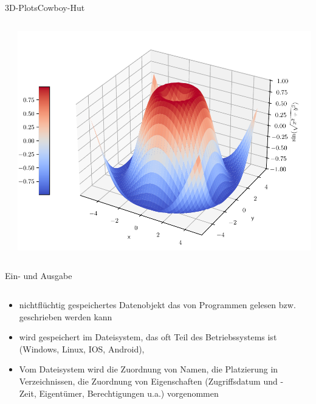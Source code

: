 \documentclass[xelatex,aspectratio=169]{beamer}
\begin{document}
\begin{frame}{3D-Plots}{Cowboy-Hut}
    \begin{columns}
        \begin{column}{0.6\textwidth}
            \vspace{-\baselineskip}
            \small
            \inputminted[firstline=7]{python}{src/plt_3d_cowboy.py}
        \end{column}
        \begin{column}{0.4\textwidth}
            \includegraphics[width=\textwidth]{fig/plt_3d_cowboy.pdf}
        \end{column}
    \end{columns}
\end{frame}

\begin{frame}{Ein- und Ausgabe}
    \begin{columns}
        \begin{column}{0.5\textwidth}
            \begin{itemize}
                \item nichtflüchtig gespeichertes Datenobjekt das von Programmen gelesen bzw. geschrieben werden kann
                \item wird gespeichert im Dateisystem, das oft Teil des Betriebssystems ist (Windows, Linux, IOS, Android),
                \item Vom Dateisystem wird die Zuordnung von Namen, die Platzierung in Verzeichnissen, die Zuordnung von Eigenschaften (Zugriffsdatum und -Zeit, Eigentümer, Berechtigungen u.a.) vorgenommen
            \end{itemize}
        \end{column}
        \begin{column}{0.5\textwidth}
        \end{column}
    \end{columns}
\end{frame}
\end{document}
